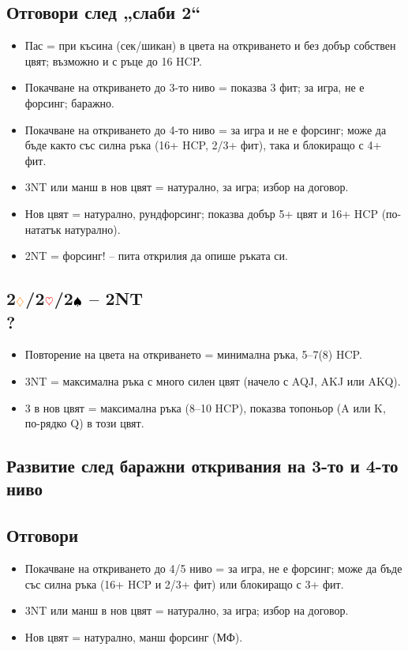 \documentclass[10pt,a5paper]{extarticle}
\newcommand{\Rheart}{\textcolor{red}{\heartsuit}}
\newcommand{\Rdiamond}{\textcolor{orange}{\diamondsuit}}
\newcommand{\Bspade}{\textcolor{black}{\spadesuit}}
\begin{document}
\subsection*{Отговори след „слаби 2“}
\begin{itemize}
    \item Пас = при късина (сек/шикан) в цвета на откриването и без добър собствен цвят; възможно и с ръце до 16 HCP.
    \item Покачване на откриването до 3-то ниво = показва 3 фит; за игра, не е форсинг; баражно.
    \item Покачване на откриването до 4-то ниво = за игра и не е форсинг; може да бъде както със силна ръка (16+ HCP, 2/3+ фит), така и блокиращо с 4+ фит.
    \item 3NT или манш в нов цвят = натурално, за игра; избор на договор.
    \item Нов цвят = натурално, рундфорсинг; показва добър 5+ цвят и 16+ HCP (по-нататък натурално).
    \item 2NT = форсинг! – пита открилия да опише ръката си.
\end{itemize}


\subsection*{2$\Rdiamond$/2$\Rheart$/2$\Bspade$ – 2NT\\?}
\begin{itemize}
    \item Повторение на цвета на откриването = минимална ръка, 5–7(8) HCP.
    \item 3NT = максимална ръка с много силен цвят  
        (начело с AQJ, AKJ или AKQ).
    \item 3 в нов цвят = максимална ръка (8–10 HCP), показва топоньор  
        (A или K, по-рядко Q) в този цвят.
\end{itemize}

\subsection*{Развитие след баражни откривания на 3-то и 4-то ниво}

\subsection*{Отговори}
\begin{itemize}
    \item Покачване на откриването до 4/5 ниво = за игра, не е форсинг;  
        може да бъде със силна ръка (16+ HCP и 2/3+ фит) или блокиращо с 3+ фит.
    \item 3NT или манш в нов цвят = натурално, за игра; избор на договор.
    \item Нов цвят = натурално, манш форсинг (МФ).
\end{itemize}
\end{document}
